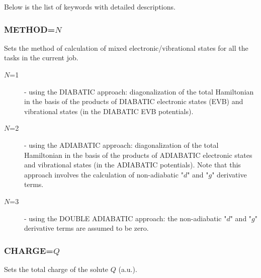 \documentclass[oneside,11pt,openany]{book}
\begin{document}
Below is the list of keywords with detailed descriptions.

\subsubsection*{METHOD=$N$}
Sets the method of calculation of mixed electronic/vibrational states
for all the tasks in the current job.
\begin{description}
\item[$N$=1] - using the DIABATIC approach: diagonalization
         of the total Hamiltonian in the basis of the
         products of DIABATIC electronic states (EVB)
         and vibrational states (in the DIABATIC
         EVB potentials).

\item[$N$=2] - using the ADIABATIC approach: diagonalization
         of the total Hamiltonian in the basis of the
         products of ADIABATIC electronic states
         and vibrational states (in the ADIABATIC
         potentials). Note that this approach involves
         the calculation of non-adiabatic "$d$" and "$g$"
         derivative terms.

\item[$N$=3] - using the DOUBLE ADIABATIC approach: the
         non-adiabatic "$d$" and "$g$" derivative terms
         are assumed to be zero.
\end{description}

\subsubsection*{CHARGE=$Q$}
%
Sets the total charge of the solute $Q$ (a.u.).
\end{document}
